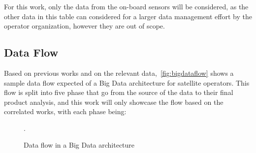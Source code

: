 For this work, only the data from the on-board sensors will be considered, as the other data in this table can considered for a larger data management effort by the operator organization, however they are out of scope.

\subsection{Data Flow}\label{ch:corr:dataflow}

Based on previous works and on the relevant data,~\autoref{fig:bigdataflow} shows a sample data flow expected of a Big Data architecture for satellite operators.
This flow is split into five phase that go from the source of the data to their final product analysis, and this work will only showcase the flow based on the correlated works, with each phase being:

\begin{figure}[ht]
  \caption{Data flow in a Big Data architecture}\label{fig:bigdataflow}
  \vspace{6mm}
  \begin{center}
  \end{center}
  \vspace{2mm}
  \legenda{}
  .
\end{figure}


